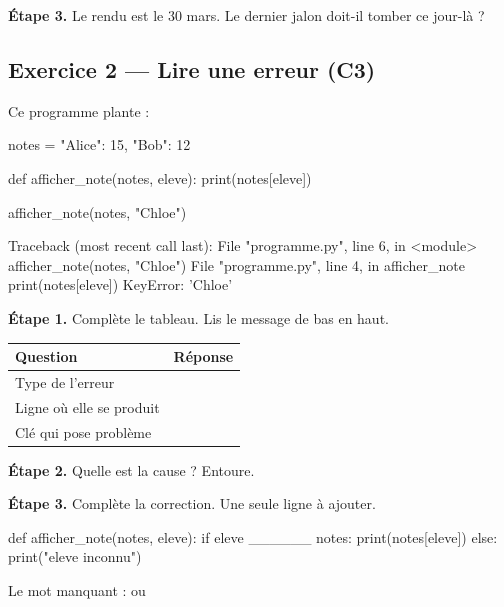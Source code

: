 \bigskip

\textbf{Étape 3.} Le rendu est le $30$ mars. Le dernier jalon doit-il tomber ce jour-là ?

\medskip
\begin{center}
 \qquad {}
\end{center}

\bigskip
\bigskip

\subsection*{Exercice 2 --- Lire une erreur (C3)}

Ce programme plante :

\begin{python}
notes = {"Alice": 15, "Bob": 12}

def afficher_note(notes, eleve):
    print(notes[eleve])

afficher_note(notes, "Chloe")
\end{python}

\medskip

\begin{console}
Traceback (most recent call last):
  File "programme.py", line 6, in <module>
    afficher_note(notes, "Chloe")
  File "programme.py", line 4, in afficher_note
    print(notes[eleve])
KeyError: 'Chloe'
\end{console}

\bigskip

\textbf{Étape 1.} Complète le tableau. Lis le message de bas en haut.

\bigskip

\begin{center}
\begin{tabular}{|l|c|}
\hline
\textbf{Question} & \textbf{Réponse} \\
\hline
Type de l'erreur & \dotfill \\
\hline
Ligne où elle se produit & \dotfill \\
\hline
Clé qui pose problème & \dotfill \\
\hline
\end{tabular}
\end{center}

\bigskip

\textbf{Étape 2.} Quelle est la cause ? Entoure.

\medskip
\begin{center}
 \qquad {}
\end{center}

\bigskip

\textbf{Étape 3.} Complète la correction. Une seule ligne à ajouter.

\begin{python}
def afficher_note(notes, eleve):
    if eleve ______ notes:
        print(notes[eleve])
    else:
        print("eleve inconnu")
\end{python}

\medskip
Le mot manquant :  \qquad ou \qquad \fbox{\texttt{==}}
